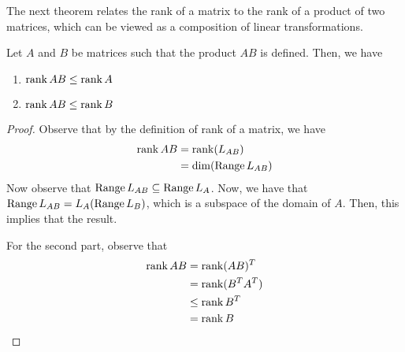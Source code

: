 \documentclass[main.tex]{subfiles}
\begin{document}
    The next theorem relates the rank of a matrix to the rank of a product of two matrices, which can be viewed as a composition of linear transformations. 
    \begin{thrm}{}{}
        Let $A$ and $B$ be matrices such that the product $AB$ is defined. Then, we have
        \begin{enumerate}
            \item $\operatorname{rank} AB \leq \operatorname{rank} A$
            \item $\operatorname{rank} AB \leq \operatorname{rank} B$ 
        \end{enumerate}
    \end{thrm}
    \begin{proof}
        Observe that by the definition of rank of a matrix, we have
        \begin{align*}
            \operatorname{rank} AB &= \operatorname{rank} (L_{AB}) \\
            &= \operatorname{dim} (\operatorname{Range} L_{AB}) 
        \end{align*}
        Now observe that $\operatorname{Range} L_{AB} \subseteq \operatorname{Range} L_A$. Now, we have that $\operatorname{Range} L_{AB} = L_A(\operatorname{Range} L_B)$, which is a subspace of the domain of $A$. Then, this implies that the result. \par 

        For the second part, observe that 
        \begin{align*}
            \operatorname{rank} AB &= \operatorname{rank} (AB)^T \\
            &= \operatorname{rank} (B^TA^T) \\ 
            &\leq \operatorname{rank} B^T \\
            &= \operatorname{rank} B
        \end{align*}
    \end{proof}
\end{document}
